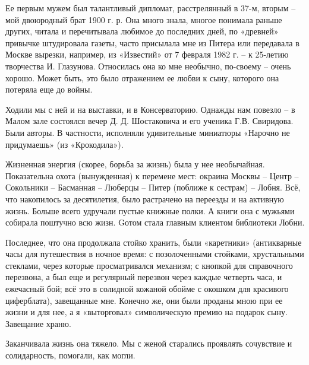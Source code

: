 Ее первым мужем был талантливый дипломат, расстрелянный в 37-м, вторым – мой двоюродный брат 1900 г. р. Она много знала, многое понимала раньше других, читала и перечитывала любимое до последних дней, по «древней» привычке штудировала газеты, часто присылала мне из Питера или передавала в Москве  вырезки, например,  из «Известий» от 7 февраля 1982 г.  – к 25-летию творчества И. Глазунова.
Относилась она ко мне необычно,  по-своему – очень хорошо. Может быть, это было отражением ее любви к сыну, которого она потеряла еще до войны.

Ходили мы с ней и на выставки, и в Консерваторию. Однажды нам повезло – в Малом зале состоялся вечер Д. Д. Шостаковича и его ученика Г.В. Свиридова. Были авторы. В частности, исполняли удивительные миниатюры «Нарочно не придумаешь» (из «Крокодила»).

Жизненная энергия (скорее, борьба за жизнь) была у нее необычайная. Показательна охота (вынужденная) к перемене мест: окраина Москвы – Центр –  Сокольники – Басманная – Люберцы – Питер (поближе к сестрам) – Лобня. Всё, что накопилось за десятилетия, было растрачено на переезды и на активную жизнь. Больше всего удручали пустые книжные полки. А книги она с мужьями собирала поштучно всю жизн. Gотом стала главным клиентом библиотеки Лобни.

Последнее, что она продолжала стойко хранить, были «каретники» (антикварные часы для путешествия в ночное время: с позолоченными стойками,  хрустальными стеклами, через которые просматривался механизм; с кнопкой для справочного перезвона, а был еще и регулярный перезвон через каждые четверть часа, и ежечасный бой; всё это в солидной кожаной обойме с окошком для красивого циферблата), завещанные мне. Конечно же, они были проданы мною при ее жизни и для нее, а я «выторговал» символическую премию на подарок сыну. Завещание храню.

Заканчивала жизнь она тяжело. Мы с женой старались проявлять сочувствие и солидарность, помогали, как могли.


